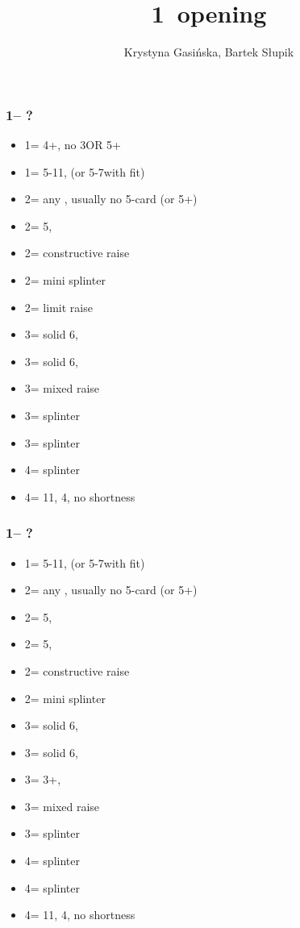 \documentclass[12pt, a4paper]{article}
\title{1\majs\ opening}
\author{Krystyna Gasińska, Bartek Słupik}
\begin{document}
\maketitle


\subsubsection*{1\hearts -- ?}
\begin{itemize}
    \item 1\spades = 4+\spades, no 3\hearts OR 5\hearts + \gf
    \item 1\nt = 5-11\hcp, (or 5-7\hcp with \hearts fit)
    \item 2\clubs = any \gf, usually no 5-card (or 5+\clubs)
    \item 2\diams = 5\diams, \gf
    \item 2\hearts = constructive raise
    \item 2\spades = mini splinter
    \item 2\nt = limit raise
    \item 3\clubs = solid 6\clubs, \inv
    \item 3\diams = solid 6\diams, \inv
    \item 3\hearts = mixed raise
    \item 3\spades = splinter \spades
    \item 3\nt = splinter \diams
    \item 4\clubs = splinter \clubs
    \item 4\diams = 11\hcp, 4\hearts, no shortness
\end{itemize}

\subsubsection*{1\spades -- ?}
\begin{itemize}
    \item 1\nt = 5-11\hcp, (or 5-7\hcp with \spades fit)
    \item 2\clubs = any \gf, usually no 5-card (or 5+\clubs)
    \item 2\diams = 5\diams, \gf
    \item 2\hearts = 5\hearts, \gf
    \item 2\spades = constructive raise
    \item 2\nt = mini splinter
    \item 3\clubs = solid 6\clubs, \inv
    \item 3\diams = solid 6\diams, \inv
    \item 3\hearts = 3+\spades, \inv
    \item 3\spades = mixed raise
    \item 3\nt = splinter \hearts
    \item 4\clubs = splinter \clubs
    \item 4\diams = splinter \diams
    \item 4\hearts = 11\hcp, 4\spades, no shortness
\end{itemize}

\end{document}
